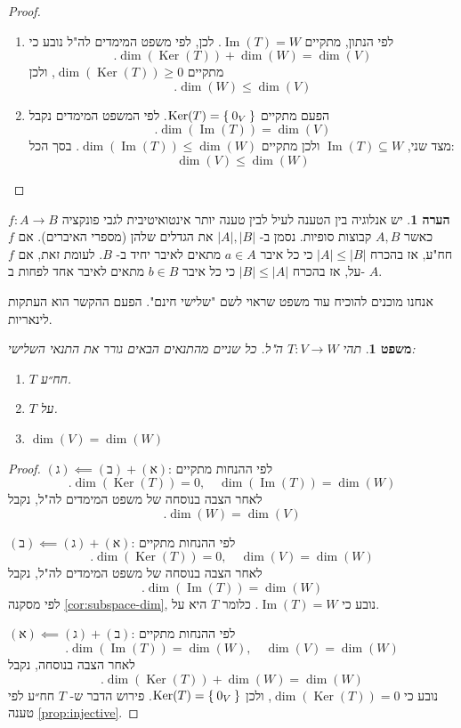 \documentclass[12pt]{report}
\theoremstyle{plain}
\newtheorem{theorem}{משפט}[chapter]
\theoremstyle{definition}
\newtheorem{remark}{הערה}[chapter]
\newcommand{\0}{\mathbf{0}}
\DeclareMathOperator{\Ker}{Ker}
\DeclareMathOperator{\Image}{Im}
\begin{document}
\begin{proof}\
\begin{enumerate}[label=\alph*.]
\item
לפי הנתון, מתקיים 
$\Image(T)=W$.
לכן, לפי משפט המימדים לה"ל נובע כי
$$
.\dim(\Ker(T))+\dim(W)=\dim(V)
$$
מתקיים
$\dim(\Ker(T))\geq 0$,
ולכן
$$
.\dim(W)\leq\dim(V)
$$


\item 
הפעם מתקיים 
$\Ker(T)=\Set{0_V}$.
לפי המשפט המימדים נקבל
$$
.\dim(\Image(T))=\dim(V)
$$
מצד שני, 
$\Image(T)\subseteq W$
ולכן מתקיים
$\dim(\Image(T))\leq \dim(W)$.
בסך הכל:
$$
\dim(V)\leq\dim(W)
$$

\end{enumerate}
\end{proof}

\begin{remark}
יש אנלוגיה בין הטענה לעיל לבין טענה יותר אינטואיטיבית לגבי פונקציה
$f:A\to B$
כאשר 
$A,B$
קבוצות סופיות. נסמן ב-
$|A|,|B|$
את הגדלים שלהן (מספרי האיברים). אם 
$f$
חח"ע, אז בהכרח 
$|A|\leq|B|$
כי כל איבר
$a\in A$
מתאים לאיבר יחיד ב-
$B$.
לעומת זאת, אם
$f$
על, אז בהכרח
$|B|\leq|A|$
כי כל איבר 
$b\in B$
מתאים לאיבר אחד לפחות ב-
$A$.
\end{remark}

אנחנו מוכנים להוכיח עוד משפט שראוי לשם "שלישי חינם". הפעם ההקשר הוא העתקות לינאריות.

\begin{theorem}\label{thm:3-for-2-iso}
תהי
$T:V\to W$
ה"ל. כל שניים מהתנאים הבאים גורר את התנאי השלישי:
\begin{enumerate}[label=\alph*.]
\item 
$T$
חח״ע.


\item
$T$
על.


\item 
$\dim(V)=\dim(W)$


\end{enumerate}
\end{theorem}

\begin{proof}
$(\text{ג})\impliedby(\text{ב})+(\text{א})$:
לפי ההנחות מתקיים
$$
.\dim(\Ker(T))=0,\quad \dim(\Image(T))=\dim(W)
$$
לאחר הצבה בנוסחה של משפט המימדים לה"ל, נקבל
$$
.\dim(W)=\dim(V)
$$

$(\text{ב})\impliedby(\text{ג})+(\text{א})$:
לפי ההנחות מתקיים
$$
.\dim(\Ker(T))=0,\quad \dim(V)=\dim(W)
$$
לאחר הצבה בנוסחה של משפט המימדים לה"ל, נקבל
$$
.\dim(\Image(T))=\dim(W)
$$
לפי מסקנה
\ref{cor:subspace-dim},
נובע כי
$\Image(T)=W$.
כלומר 
$T$
היא על.

$(\text{א})\impliedby(\text{ג})+(\text{ב})$:
לפי ההנחות מתקיים
$$
.\dim(\Image(T))=\dim(W),\quad \dim(V)=\dim(W)
$$
לאחר הצבה בנוסחה, נקבל
$$
.\dim(\Ker(T))+\dim(W)=\dim(W)
$$
נובע כי
$\dim(\Ker(T))=0$,
ולכן
$\Ker(T)=\Set{0_V}$.
פירוש הדבר ש-
$T$
חח״ע לפי טענה
\ref{prop:injective}.

\end{proof}
\end{document}
